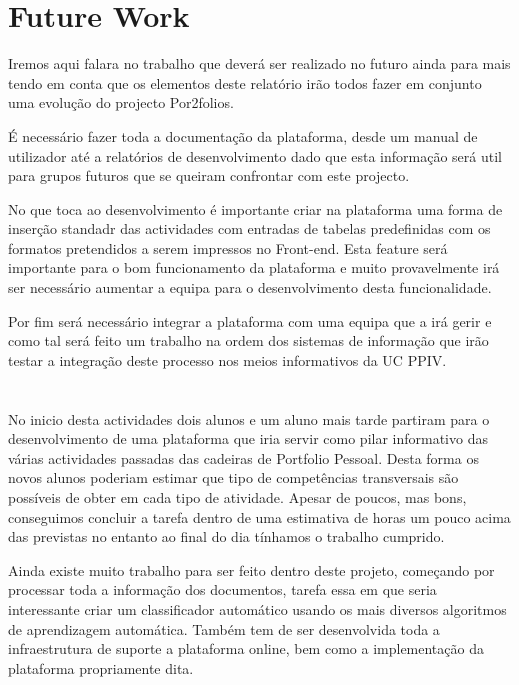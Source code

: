 \documentclass[a4paper,12pt,journal,twoside,compsoc]{PPIEEEtran}
\begin{document}

\section{Future Work}

Iremos aqui falara no trabalho que deverá ser realizado no futuro ainda para mais tendo em conta que os elementos deste relatório irão todos fazer em conjunto uma evolução do projecto Por2folios.

É necessário fazer toda a documentação da plataforma, desde um manual de utilizador até a relatórios de desenvolvimento dado que esta informação será util para grupos futuros que se queiram confrontar com este projecto.

No que toca ao desenvolvimento é importante criar na plataforma uma forma de inserção standadr das actividades com entradas de tabelas predefinidas com os formatos pretendidos a serem impressos no Front-end. Esta feature será importante para o bom funcionamento da plataforma e muito provavelmente irá ser necessário aumentar a equipa para o desenvolvimento desta funcionalidade.

Por fim será necessário integrar a plataforma com uma equipa que a irá gerir e como tal será feito um trabalho na ordem dos sistemas de informação que irão testar a integração deste processo nos meios informativos da UC PPIV.

\section{}

No inicio desta actividades dois alunos e um aluno mais tarde partiram para o desenvolvimento de uma plataforma que iria servir como pilar informativo das várias actividades passadas das cadeiras de Portfolio Pessoal. Desta forma os novos alunos poderiam  estimar que tipo de competências transversais são possíveis de obter em cada tipo de atividade. Apesar de poucos, mas bons, conseguimos concluir a tarefa dentro de uma estimativa de horas um pouco acima das previstas no entanto ao final do dia tínhamos o trabalho cumprido.

Ainda existe muito trabalho para ser feito dentro deste projeto, começando por processar toda a informação dos documentos, tarefa essa em que seria interessante criar um classificador automático usando os mais diversos algoritmos de aprendizagem automática. Também tem de ser desenvolvida toda a infraestrutura de suporte a plataforma online, bem como a implementação da plataforma propriamente dita.
\end{document}
